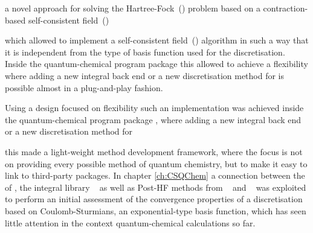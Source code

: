 a novel approach for solving the Hartree-Fock~(\HF) problem
based on a contraction-based self-consistent field~(\SCF) 

which allowed to implement a self-consistent field~(\SCF) algorithm
in such a way that it is independent from the
type of basis function used for the discretisation.
Inside the quantum-chemical program package \molsturm
this allowed to achieve a flexibility
where adding a new integral back end or a new discretisation method for \HF
is possible almost in a plug-and-play fashion.



Using a design focused on flexibility such
an implementation was achieved inside the
quantum-chemical program package \molsturm,
where adding a new integral back end or a new discretisation method for \HF

this made \molsturm a light-weight method development framework,
where the focus is not on providing every possible method
of quantum chemistry,
but to make it easy to link to third-party packages.
In chapter \ref{ch:CSQChem} a connection between the \SCF of \molsturm,
the integral library \sturmint~\cite{sturmintWeb} as well as
Post-HF methods from \pyscf~\cite{Sun2017} and \adcman~\cite{Wormit2014}
was exploited to perform an initial assessment
of the convergence properties of a discretisation based on Coulomb-Sturmians,
an exponential-type basis function,
which has seen little attention in the context quantum-chemical calculations so far.



